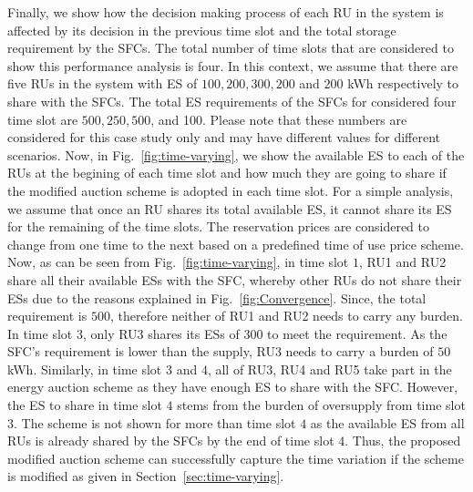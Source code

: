 \documentclass[journal,10pt]{IEEEtran}
\begin{document}
Finally, we show how the decision making process of each RU in the system is affected by its decision in the previous time slot and the total storage requirement by the SFCs. The total number of time slots that are considered to show this performance analysis is four. In this context, we assume that there are five RUs in the system with ES of $100, 200, 300, 200$ and $200$ kWh respectively to share with the SFCs. The total ES requirements of the SFCs for considered four time slot are $500, 250, 500$, and 100. Please note that these numbers are considered for this case study only and may have different values for different scenarios. Now, in Fig.~\ref{fig:time-varying}, we show the available ES to each of the RUs at the begining of each time slot and how much they are going to share if the modified auction scheme is adopted in each time slot. For a simple analysis, we assume that once an RU shares its total available ES, it cannot share its ES for the remaining of the time slots. The reservation prices are considered to change from one time to the next based on a predefined time of use price scheme. Now, as can be seen from Fig.~\ref{fig:time-varying}, in time slot $1$, RU1 and RU2 share all their available ESs with the SFC, whereby other RUs do not share their ESs due to the reasons explained in Fig.~\ref{fig:Convergence}. Since, the total requirement is $500$, therefore neither of RU1 and RU2 needs to carry any burden. In time slot $3$, only RU3 shares its ESs of $300$ to meet the requirement. As the SFC's requirement is lower than the supply, RU3 needs to carry a burden of $50$ kWh. Similarly, in time slot $3$ and $4$, all of RU3, RU4 and RU5 take part in the energy auction scheme as they have enough ES to share with the SFC. However, the ES to share in time slot $4$ stems from the burden of oversupply from time slot $3$. The scheme is not shown for more than time slot $4$ as the available ES from all RUs is already shared by the SFCs by the end of time slot $4$. Thus, the proposed modified auction scheme can successfully capture the time variation if the scheme is modified as given in Section~\ref{sec:time-varying}.
\end{document}

